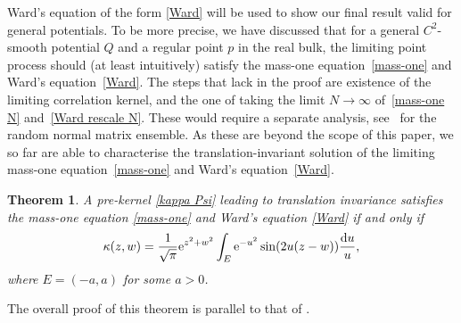 \documentclass[pdftex]{sigma}
\numberwithin{equation}{section}
\newtheorem{Theorem}{Theorem}[section]
\newcommand{\1}{\chi}
\begin{document}
Ward's equation of the form \eqref{Ward} will be used to show our final result valid for general potentials.
To be more precise, we have discussed that for a general $C^2$-smooth potential $Q$ and a regular point $p$ in the real bulk, the limiting point process should (at least intuitively) satisfy the mass-one equation~\eqref{mass-one} and Ward's equation~\eqref{Ward}.
The steps that lack in the proof are existence of the limiting correlation kernel, and the one of taking the limit \mbox{$N \to \infty$} of~\eqref{mass-one N} and~\eqref{Ward rescale N}.
These would require a separate analysis, see~\cite{MR3975882} for the random normal matrix ensemble.
As these are beyond the scope of this paper, we so far are able to characterise the translation-invariant solution of the limiting mass-one equation~\eqref{mass-one} and Ward's equation~\eqref{Ward}.

\begin{Theorem}\label{Thm_TIsol}
	A pre-kernel \eqref{kappa Psi} leading to translation invariance satisfies the mass-one equation \eqref{mass-one} and Ward's equation \eqref{Ward} if and only if
	\begin{gather} \label{kappa t.i.}
		\kappa(z,w)= \frac{1}{\sqrt{\pi}} {\rm e}^{ z^2+w^2 } \int_E {\rm e}^{-u^2} \sin(2u(z-w) ) \frac{{\rm d}u}{u},
	\end{gather}
	where $E=(-a,a)$ for some $a >0$.
\end{Theorem}

The overall proof of this theorem is parallel to that of \cite[Theorem~4]{MR4030288}.
\end{document}
